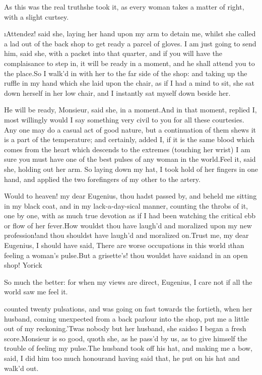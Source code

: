 \documentclass[twoside]{article}
\begin{document}
As this was the real truth\tsk she took it, as every woman takes a matter of
right, with a slight curtsey.

\tsk \i{Attendez}! said she, laying her hand upon my arm to detain me, whilst
she called a lad out of the back shop to get ready a parcel of gloves.  I
am just going to send him, said she, with a packet into that quarter, and
if you will have the complaisance to step in, it will be ready in a
moment, and he shall attend you to the place.\tsk So I walk’d in with her to
the far side of the shop: and taking up the ruffle in my hand which she
laid upon the chair, as if I had a mind to sit, she sat down herself in
her low chair, and I instantly sat myself down beside her.

\tsk He will be ready, Monsieur, said she, in a moment.\tsk And in that moment,
replied I, most willingly would I say something very civil to you for all
these courtesies.  Any one may do a casual act of good nature, but a
continuation of them shews it is a part of the temperature; and
certainly, added I, if it is the same blood which comes from the heart
which descends to the extremes (touching her wrist) I am sure you must
have one of the best pulses of any woman in the world.\tsk Feel it, said she,
holding out her arm.  So laying down my hat, I took hold of her fingers
in one hand, and applied the two forefingers of my other to the artery.\tsk 

\tsk Would to heaven! my dear Eugenius, thou hadst passed by, and beheld me
sitting in my black coat, and in my lack-a-day-sical manner, counting the
throbs of it, one by one, with as much true devotion as if I had been
watching the critical ebb or flow of her fever.\tsk How wouldst thou have
laugh’d and moralized upon my new profession!\tsk and thou shouldst have
laugh’d and moralized on.\tsk Trust me, my dear Eugenius, I should have said,
\lqq There are worse occupations in this world \i{than feeling a woman’s
pulse}.\rqq\tsk But a grisette’s! thou wouldst have said\tsk and in an open shop!
Yorick\tsk 

\tsk So much the better: for when my views are direct, Eugenius, I care not
if all the world saw me feel it.






 counted twenty pulsations, and was going on fast towards the
fortieth, when her husband, coming unexpected from a back parlour into
the shop, put me a little out of my reckoning.\tsk ’Twas nobody but her
husband, she said\tsk so I began a fresh score.\tsk Monsieur is so good, quoth
she, as he pass’d by us, as to give himself the trouble of feeling my
pulse.\tsk The husband took off his hat, and making me a bow, said, I did him
too much honour\tsk and having said that, he put on his hat and walk’d out.
\end{document}
